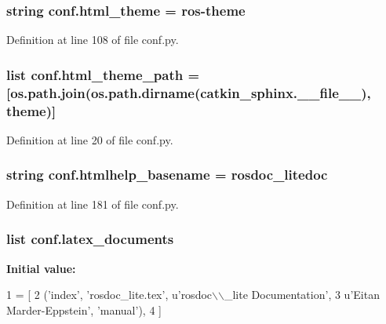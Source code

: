 \subsubsection[{\texorpdfstring{html\+\_\+theme}{html_theme}}]{\setlength{\rightskip}{0pt plus 5cm}string conf.\+html\+\_\+theme = \textquotesingle{}ros-\/theme\textquotesingle{}}\hypertarget{namespaceconf_a6c3bfcc1a44546c1c75ce20f55bd0fd6}{}\label{namespaceconf_a6c3bfcc1a44546c1c75ce20f55bd0fd6}


Definition at line 108 of file conf.\+py.

\subsubsection[{\texorpdfstring{html\+\_\+theme\+\_\+path}{html_theme_path}}]{\setlength{\rightskip}{0pt plus 5cm}list conf.\+html\+\_\+theme\+\_\+path = \mbox{[}os.\+path.\+join(os.\+path.\+dirname(catkin\+\_\+sphinx.\+\_\+\+\_\+file\+\_\+\+\_\+), \textquotesingle{}theme\textquotesingle{})\mbox{]}}\hypertarget{namespaceconf_a4960231f83b1b44a1ffcd212903b62e8}{}\label{namespaceconf_a4960231f83b1b44a1ffcd212903b62e8}


Definition at line 20 of file conf.\+py.

\subsubsection[{\texorpdfstring{htmlhelp\+\_\+basename}{htmlhelp_basename}}]{\setlength{\rightskip}{0pt plus 5cm}string conf.\+htmlhelp\+\_\+basename = \textquotesingle{}rosdoc\+\_\+litedoc\textquotesingle{}}\hypertarget{namespaceconf_aab7fddb2766ce3c430d8246fbfdbc7b1}{}\label{namespaceconf_aab7fddb2766ce3c430d8246fbfdbc7b1}


Definition at line 181 of file conf.\+py.

\subsubsection[{\texorpdfstring{latex\+\_\+documents}{latex_documents}}]{\setlength{\rightskip}{0pt plus 5cm}list conf.\+latex\+\_\+documents}\hypertarget{namespaceconf_a7812f49970f3de0d15dd7b9b9a10e3a1}{}\label{namespaceconf_a7812f49970f3de0d15dd7b9b9a10e3a1}
{\bfseries Initial value\+:}
\begin{DoxyCode}
1 = [
2   (\textcolor{stringliteral}{'index'}, \textcolor{stringliteral}{'rosdoc\_lite.tex'}, \textcolor{stringliteral}{u'rosdoc\(\backslash\)\(\backslash\)\_lite Documentation'},
3    \textcolor{stringliteral}{u'Eitan Marder-Eppstein'}, \textcolor{stringliteral}{'manual'}),
4 ]
\end{DoxyCode}


